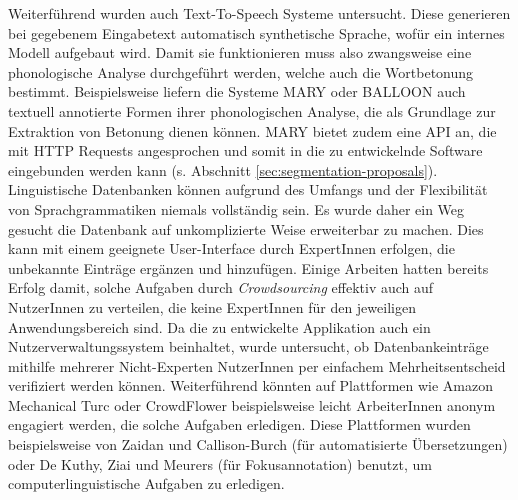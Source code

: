 Weiterführend wurden auch Text-To-Speech Systeme untersucht. Diese generieren bei gegebenem Eingabetext automatisch synthetische Sprache, wofür ein internes Modell aufgebaut wird. Damit sie funktionieren muss also zwangsweise eine phonologische Analyse durchgeführt werden, welche auch die Wortbetonung bestimmt. Beispielsweise liefern die Systeme MARY\cite{Schroder2003} oder BALLOON\cite{Reichel2012} auch textuell annotierte Formen ihrer phonologischen Analyse, die als Grundlage zur Extraktion von Betonung dienen können. MARY bietet zudem eine API an, die mit HTTP Requests angesprochen und somit in die zu entwickelnde Software eingebunden werden kann (s. Abschnitt \ref{sec:segmentation-proposals}).\\

Linguistische Datenbanken können aufgrund des Umfangs und der Flexibilität von Sprachgrammatiken niemals vollständig sein. Es wurde daher ein Weg gesucht die Datenbank auf unkomplizierte Weise erweiterbar zu machen. Dies kann mit einem geeignete User-Interface durch ExpertInnen erfolgen, die unbekannte Einträge ergänzen und hinzufügen. Einige Arbeiten hatten bereits Erfolg damit, solche Aufgaben durch \textit{Crowdsourcing} effektiv auch auf NutzerInnen zu verteilen, die keine ExpertInnen für den jeweiligen Anwendungsbereich sind. Da die zu entwickelte Applikation auch ein Nutzerverwaltungssystem beinhaltet, wurde untersucht, ob Datenbankeinträge mithilfe mehrerer Nicht-Experten NutzerInnen per einfachem Mehrheitsentscheid verifiziert werden können. Weiterführend könnten auf Plattformen wie Amazon Mechanical Turc oder CrowdFlower beispielsweise leicht ArbeiterInnen anonym engagiert werden, die solche Aufgaben erledigen\cite{Snow2008}. Diese Plattformen wurden beispielsweise von Zaidan und Callison-Burch (für automatisierte Übersetzungen)\cite{Zaidan2011} oder De Kuthy, Ziai und Meurers\cite{Meurers2015} (für Fokusannotation) benutzt, um computerlinguistische Aufgaben zu erledigen.